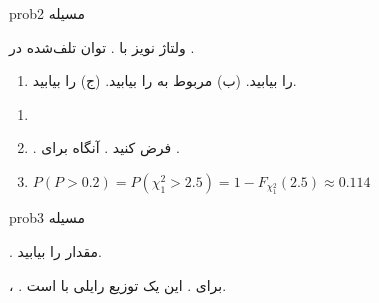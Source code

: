 \begin{PSbox}[unbreakable]{prob}{مسیله 2}

ولتاژ نویز  با . توان تلف‌شده در .

\begin{enumerate}
\def\labelenumi{(\PSalph{enumi})}
\tightlist
\item
   را بیابید. (ب)  مربوط به  را بیابید. (ج)  را بیابید.
\end{enumerate}

\PSsolution{} 

\begin{enumerate}
\def\labelenumi{(\PSalph{enumi})}
\tightlist
\item
\item
  . فرض کنید . آنگاه  برای .
\item
  $P(P > 0.2) = P(\chi^2_1 > 2.5) = 1 - F_{\chi^2_1}(2.5) \approx 0.114$
\end{enumerate}

\end{PSbox}

\begin{PSbox}[unbreakable]{prob}{مسیله 3}

. مقدار  را بیابید.

\PSsolution{} ، .\PSbr{} برای . این یک توزیع رایلی با  است.

\end{PSbox}

